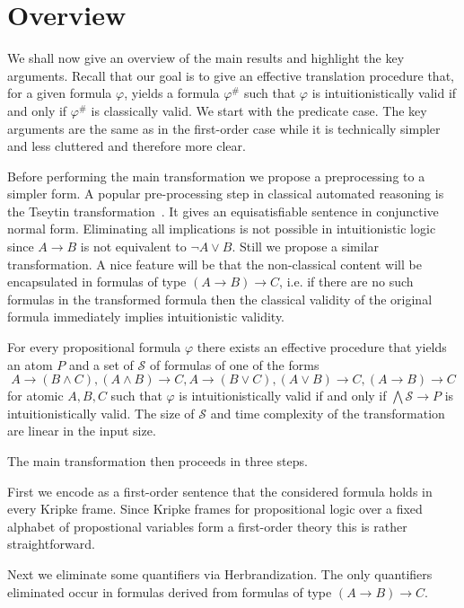 \documentclass[a4paper,UKenglish,cleveref, autoref, thm-restate]{lipics-v2021}
\begin{document}
\section{Overview}

We shall now give an overview of the main results and highlight the key arguments. Recall that our goal is to give an effective translation procedure that, for a given formula $\varphi$, yields a formula $\varphi^\#$ such that $\varphi$ is intuitionistically valid if and only if $\varphi^\#$ is classically valid. We start with the predicate case. The key arguments are the same as in the first-order case while it is technically simpler and less cluttered and therefore more clear.

Before performing the main transformation we propose a preprocessing to a simpler form. A popular pre-processing step in classical automated reasoning is the Tseytin transformation~\cite{tseitin1983complexity}. It gives an equisatisfiable sentence in conjunctive normal form. Eliminating all implications is not possible in intuitionistic logic since $A\to B$ is not equivalent to $\neg A\vee B$. Still we propose a similar transformation. A nice feature will be that the non-classical content will be encapsulated in formulas of type $(A\to B)\to C$, i.e. if there are no such formulas in the transformed formula then the classical validity of the original formula immediately implies intuitionistic validity.

\begin{theorem}
	For every propositional formula $\varphi$ there exists an effective procedure that yields an atom $P$ and a set of $\mathcal S$ of formulas  of one of the forms
	$$A\to (B\wedge C), (A\wedge B)\to C, A\to (B\vee C), (A\vee B)\to C, (A\to B)\to C$$for atomic $A, B, C$ such that $\varphi$ is intuitionistically valid if and only if $\bigwedge\mathcal S\to P$ is intuitionistically valid. The size of $\mathcal S$ and time complexity of the transformation are linear in the input size.
\end{theorem}

The main transformation then proceeds in three steps.

First we encode as a first-order sentence that the considered formula holds in every Kripke frame. Since Kripke frames for propositional logic over a fixed alphabet of propostional variables form a first-order theory this is rather straightforward.

Next we eliminate some quantifiers via Herbrandization. The only quantifiers eliminated occur in formulas derived from formulas of type $(A\to B)\to C$.
\end{document}
